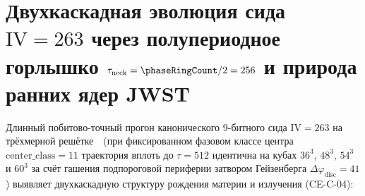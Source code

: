 \section{Двухкаскадная эволюция сида \texorpdfstring{$\mathrm{IV}=263$}{IV=263} через полупериодное горлышко \texorpdfstring{$\tau_{\mathrm{neck}} = \phaseRingCount/2 = 256$}{t=256} и природа ранних ядер JWST}
\label{sec:cosmo-two-epoch-bottleneck}

Длинный побитово-точный прогон канонического 9-битного сида $\mathrm{IV} = 263$ на трёхмерной решётке~\latGCKshort\ (при фиксированном фазовом классе центра $\mathrm{center\_class} = 11$ траектория вплоть до $\tau = 512$ идентична на кубах $36^3$, $48^3$, $54^3$ и $60^3$ за счёт гашения подпороговой периферии затвором Гейзенберга $\Delta\varphi_{\mathrm{disc}} = 41$) выявляет двухкаскадную структуру рождения материи и излучения (CE-C-04):
